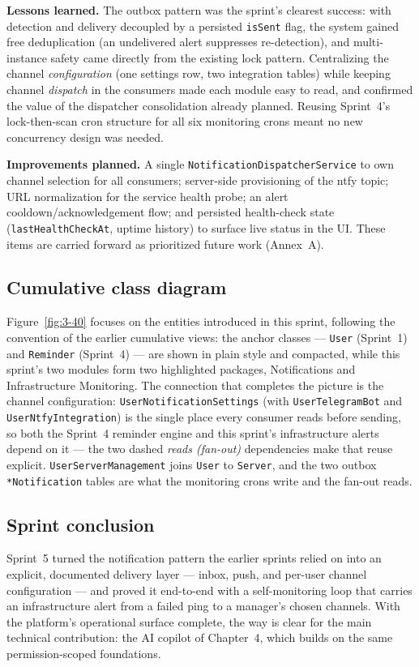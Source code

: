 \textbf{Lessons learned.} The outbox pattern was the sprint's clearest success: with detection
and delivery decoupled by a persisted \texttt{isSent} flag, the system gained free deduplication
(an undelivered alert suppresses re-detection), and multi-instance safety came directly from the
existing lock pattern. Centralizing the channel \emph{configuration} (one settings row, two
integration tables) while keeping channel \emph{dispatch} in the consumers made each module
easy to read, and confirmed the value of the dispatcher consolidation already
planned. Reusing Sprint~4's lock-then-scan cron structure for all six monitoring crons meant no
new concurrency design was needed.

\textbf{Improvements planned.} A single \texttt{NotificationDispatcherService} to own channel
selection for all consumers; server-side provisioning of the ntfy topic; URL normalization for
the service health probe; an alert cooldown/acknowledgement flow; and persisted health-check
state (\texttt{lastHealthCheckAt}, uptime history) to surface live status in the UI. These
items are carried forward as prioritized future work (Annex~A).

\subsection{Cumulative class diagram}

Figure~\ref{fig:3-40} focuses on the entities introduced in this sprint, following the
convention of the earlier cumulative views: the anchor classes --- \texttt{User} (Sprint~1)
and \texttt{Reminder} (Sprint~4) --- are shown in plain style and compacted, while this
sprint's two modules form two highlighted packages, Notifications and Infrastructure
Monitoring. The connection that completes the picture is the channel configuration:
\texttt{UserNotificationSettings} (with \texttt{UserTelegramBot} and
\texttt{UserNtfyIntegration}) is the single place every consumer reads before sending, so both
the Sprint~4 reminder engine and this sprint's infrastructure alerts depend on it ---
the two dashed \emph{reads (fan-out)} dependencies make that reuse explicit.
\texttt{UserServerManagement} joins \texttt{User} to \texttt{Server}, and the two outbox
\texttt{*Notification} tables are what the monitoring crons write and the fan-out reads.


\subsection{Sprint conclusion}

Sprint~5 turned the notification pattern the earlier sprints relied on into an explicit,
documented delivery layer --- inbox, push, and per-user channel configuration --- and proved it
end-to-end with a self-monitoring loop that carries an infrastructure alert from a failed ping
to a manager's chosen channels. With the platform's operational surface complete, the way is
clear for the main technical contribution: the AI copilot of Chapter~4, which builds on the
same permission-scoped foundations.
